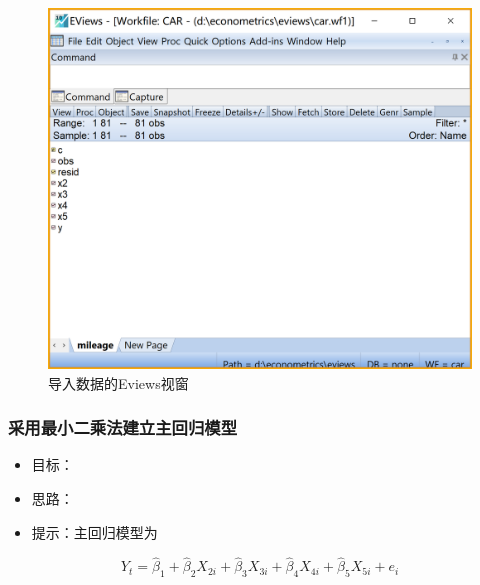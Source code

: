 \documentclass[12pt,(landscape,a4paper),(portrait,a4paper)]{article}
\providecommand{\tightlist}{%
  \setlength{\itemsep}{0pt}\setlength{\parskip}{0pt}}
\begin{document}
\begin{figure}

{\centering \includegraphics[width=21.22in]{picture/lab6-heteroskedasticity/1-load-data} 

}

\caption{导入数据的Eviews视窗}\label{fig:fig-load-data}
\end{figure}

\hypertarget{main-model}{%
\subsubsection{采用最小二乘法建立主回归模型}\label{main-model}}

\begin{itemize}
\tightlist
\item
  目标：
\item
  思路：
\item
  提示：主回归模型为
\end{itemize}

\[Y_t=\hat{\beta}_1+\hat{\beta}_2X_{2i}+\hat{\beta}_3X_{3i}+\hat{\beta}_4X_{4i}+\hat{\beta}_5X_{5i}+e_{i}\]
\end{document}
